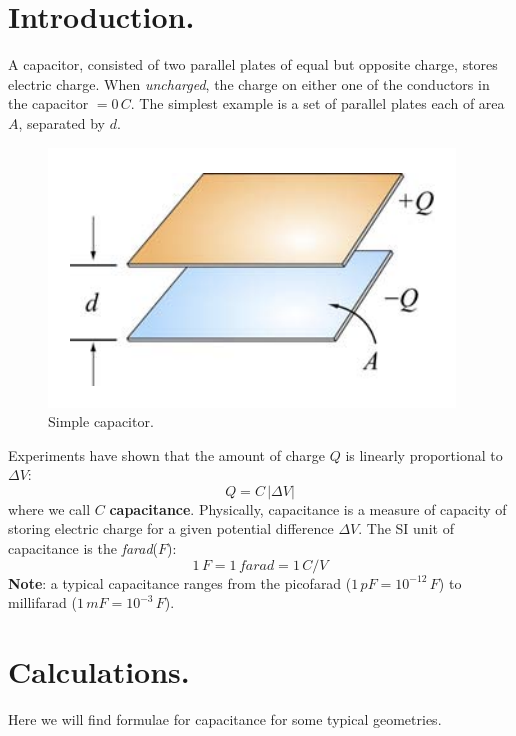\documentclass[11pt, letterpaper]{article}
\begin{document}
\section{Introduction.}
A capacitor, consisted of two parallel plates of equal but opposite charge, stores electric charge. When \textit{uncharged}, the charge on either one of the conductors in the capacitor $ = 0\, C$. The simplest example is a set of parallel plates each of area $A$, separated by $d$. 
\begin{figure}[h!]
	\centering
	\includegraphics[scale=0.8]{simple-capacitor.png}
	\caption{Simple capacitor.}
	\label{fig:simple-capacitor}
\end{figure}

Experiments have shown that the amount of charge $Q$ is linearly proportional to $\Delta V$:
\begin{equation}\label{eqn:capacitance}
	\boxed{Q = C\,|\Delta V|}
\end{equation}
where we call $C$ \textbf{capacitance}. Physically, capacitance is a measure of capacity of storing electric charge for a given potential difference $\Delta V$. The SI unit of capacitance is the \textit{farad}($F$): \[1\, F = 1\, farad = 1\, C/V\] \textbf{Note}: a typical capacitance ranges from the picofarad ($1\, pF = 10^{-12}\, F$) to millifarad ($1\, mF = 10^{-3}\, F$). 

\section{Calculations.}
Here we will find formulae for capacitance for some typical geometries.
\end{document}
